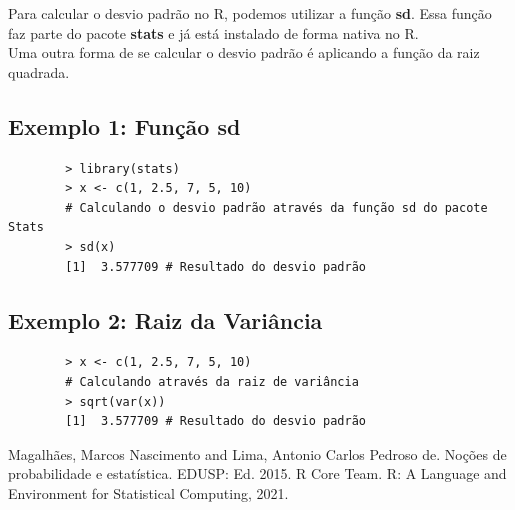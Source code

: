 \documentclass[12pt,a4paper]{article}
\begin{document}
	Para calcular o desvio padrão no R, podemos utilizar a função \textbf{sd}. Essa função faz parte do pacote \textbf{stats} e já está instalado de forma nativa no R.\\
	Uma outra forma de se calcular o desvio padrão é aplicando a função da raiz quadrada. \\

	\subsection*{Exemplo 1: Função sd}

	\begin{verbatim}
		> library(stats)
		> x <- c(1, 2.5, 7, 5, 10)
		# Calculando o desvio padrão através da função sd do pacote Stats
		> sd(x)
		[1]  3.577709 # Resultado do desvio padrão
	\end{verbatim}
	
	\subsection*{Exemplo 2: Raiz da Variância}
	
	\begin{verbatim}
		> x <- c(1, 2.5, 7, 5, 10)
		# Calculando através da raiz de variância
		> sqrt(var(x))
		[1]  3.577709 # Resultado do desvio padrão
		\end{verbatim}

	
	
	\begin{thebibliography}{100}
		
		 Magalhães, Marcos Nascimento and Lima, Antonio Carlos Pedroso de. Noções de probabilidade e estatística. EDUSP: Ed. 2015.
		 R Core Team. R: A Language and Environment for Statistical Computing, 2021.
	\end{thebibliography}
	
\end{document}
